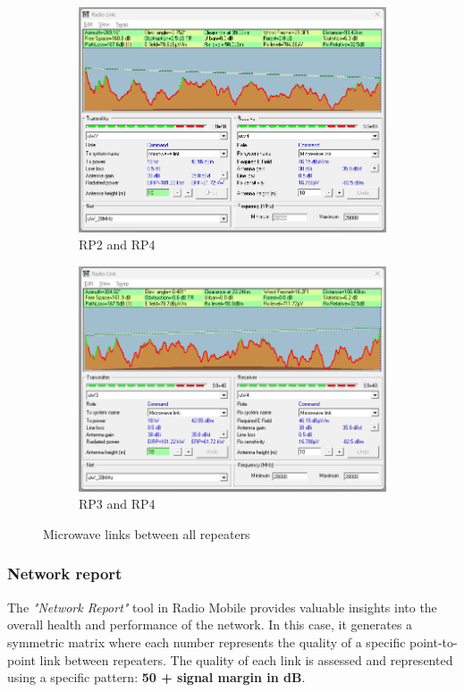 \begin{figure}[H]
\begin{subfigure}[b]{0.45\textwidth}
            \includegraphics[width=\textwidth]{Images/uWL2-4.png}
            \caption{\small RP2 and RP4}    
            \label{fig:RP2-RP4}
        \end{subfigure}
        \hfill
        \begin{subfigure}[b]{0.45\textwidth}
            \centering
            \includegraphics[width=\textwidth]{Images/uWL3-4.png}
            \caption{\small RP3 and RP4}    
            \label{fig:RP3-RP4}
        \end{subfigure}
        \caption{Microwave links between all repeaters} 
        \label{fig:IndNetCov}
\end{figure}

\subsubsection{Network report}
The \textit{"Network Report"} tool in Radio Mobile provides valuable insights into the overall health and performance of the network.
In this case, it generates a symmetric matrix where each number represents the quality of a specific point-to-point link between repeaters.
The quality of each link is assessed and represented using a specific pattern: \textbf{50 + signal margin in dB}.

